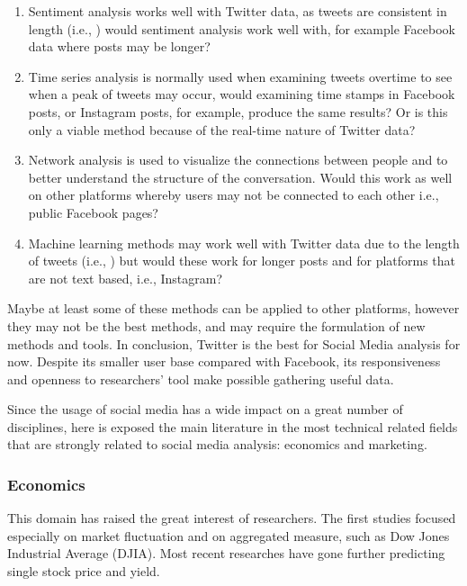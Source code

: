 \documentclass[]{book}
\providecommand{\tightlist}{%
  \setlength{\itemsep}{0pt}\setlength{\parskip}{0pt}}
\begin{document}
\begin{enumerate}
\def\labelenumi{\arabic{enumi}.}
\tightlist
\item
  Sentiment analysis works well with Twitter data, as tweets are
  consistent in length (i.e., ) would sentiment analysis work well with,
  for example Facebook data where posts may be longer?
\item
  Time series analysis is normally used when examining tweets overtime
  to see when a peak of tweets may occur, would examining time stamps in
  Facebook posts, or Instagram posts, for example, produce the same
  results? Or is this only a viable method because of the real-time
  nature of Twitter data?
\item
  Network analysis is used to visualize the connections between people
  and to better understand the structure of the conversation. Would this
  work as well on other platforms whereby users may not be connected to
  each other i.e., public Facebook pages?
\item
  Machine learning methods may work well with Twitter data due to the
  length of tweets (i.e., ) but would these work for longer posts and
  for platforms that are not text based, i.e., Instagram?
\end{enumerate}

Maybe at least some of these methods can be applied to other platforms,
however they may not be the best methods, and may require the
formulation of new methods and tools. In conclusion, Twitter is the best
for Social Media analysis for now. Despite its smaller user base
compared with Facebook, its responsiveness and openness to researchers'
tool make possible gathering useful data.

Since the usage of social media has a wide impact on a great number of
disciplines, here is exposed the main literature in the most technical
related fields that are strongly related to social media analysis:
economics and marketing.

\subsubsection{Economics}\label{economics}

This domain has raised the great interest of researchers. The first
studies focused especially on market fluctuation and on aggregated
measure, such as Dow Jones Industrial Average (DJIA). Most recent
researches have gone further predicting single stock price and yield.
\end{document}
